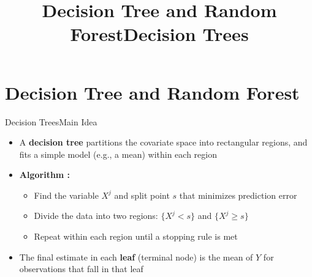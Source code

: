 \documentclass[hyperref={pdfpagelabels=false}]{beamer}
\begin{document}
\title[]
{Decision Tree and Random Forest}

\subtitle{}
\author{}
\institute{}
\date{}

\begin{frame}{}
  \titlepage
\end{frame}

\section{Decision Tree and Random Forest}

\title[]
{Decision Trees}

\author{}
\institute{}
\date{}

\begin{frame}{}
	\titlepage
\end{frame}




\begin{frame}{Decision Trees}{Main Idea}
	\begin{itemize}
		\item A \textbf{decision tree} partitions the covariate space into rectangular regions, and fits a simple model (e.g., a mean) within each region
		\vspace{0.3cm}

		\item \textbf{Algorithm :}
		\vspace{0.2cm}
		\begin{itemize}
			\item[1] Find the variable $X^j$ and split point $s$ that minimizes prediction error
			\vspace{0.2cm}
			\item[2] Divide the data into two regions: $\{X^j < s\}$ and $\{X^j \geq s\}$
			\vspace{0.2cm}
			\item[3] Repeat within each region until a stopping rule is met
		\end{itemize}
		\vspace{0.3cm}
		\item The final estimate in each \textbf{leaf} (terminal node) is the mean of $Y$ for observations that fall in that leaf
	\end{itemize}
\end{frame}
\end{document}
